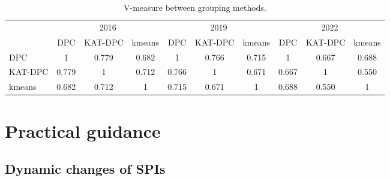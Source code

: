 \documentclass{article}
\begin{document}
\begin{table}[H]
\centering
\caption{V-measure between grouping methods.\label{tab:vmeasure}}
\small
\begin{tabular}{l*{9}{c}}
\toprule
 & \multicolumn{3}{c}{2016} & \multicolumn{3}{c}{2019} & \multicolumn{3}{c}{2022} \\
\cmidrule(lr){2-4}\cmidrule(lr){5-7}\cmidrule(lr){8-10}
 & DPC & KAT-DPC & kmeans & DPC & KAT-DPC & kmeans & DPC & KAT-DPC & kmeans \\
\midrule
DPC & 1 & 0.779 & 0.682 & 1 & 0.766 & 0.715 & 1 & 0.667 & 0.688 \\
KAT-DPC & 0.779 & 1 & 0.712 & 0.766 & 1 & 0.671 & 0.667 & 1 & 0.550 \\
kmeans & 0.682 & 0.712 & 1 & 0.715 & 0.671 & 1 & 0.688 & 0.550 & 1 \\
\bottomrule
\end{tabular}
\end{table}

\section{Practical guidance}

\subsection{Dynamic changes of SPIs}
\end{document}
